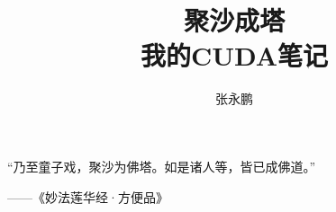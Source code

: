 \documentclass[12pt,a4paper]{book}
\title{{\huge 聚沙成塔} \\ 我的CUDA笔记}%
\author{张永鹏} %
\begin{document}
 
\clearpage
 
\maketitle %

\begin{center}
\vspace*{3.5in}
\large{
“乃至童子戏，聚沙为佛塔。如是诸人等，皆已成佛道。”\\
            \par\par\par\par\par\par \par\par\par\par                          ------《妙法莲华经·方便品》
}
\end{center}

\tableofcontents
% 




 
 


\end{document}
